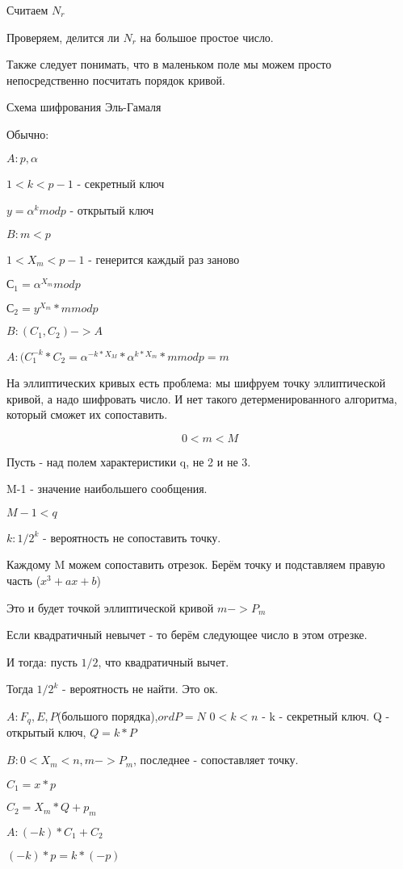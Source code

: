 Считаем $N_r$

Проверяем, делится ли $N_r$ на большое простое число. 

Также следует понимать, что в маленьком поле мы можем просто непосредственно посчитать порядок кривой. 

Схема шифрования Эль-Гамаля

Обычно:

$A: p, \alpha$

$1<k<p-1$ - секретный ключ

$y = \alpha^k mod p$ - открытый ключ

$B: m<p$

$1 < X_m < p-1$ - генерится каждый раз заново

$С_1 = \alpha^{X_m} mod p$

$С_2 = y^{X_m}*m mod p$

$B: (C_1, C_2) -> A $

$A: (C_1 ^ {-k} * C_2 = \alpha^{-k*X_M} * \alpha^{k*X_m}*m mod p = m$

На эллиптических кривых есть проблема: мы шифруем точку эллиптической кривой, а надо шифровать число. И нет такого детерменированного алгоритма, который сможет их сопоставить. 

$$ 0 < m < M $$

Пусть - над полем характеристики q, не 2 и не 3. 

M-1 - значение наибольшего сообщения. 

$ M - 1 < q$

$k : 1/{2^k}$ - вероятность не сопоставить точку. 

Каждому M можем сопоставить отрезок. Берём точку и подставляем правую часть ($x^3+ax+b$)

Это и будет точкой эллиптической кривой $m -> P_m$

Если квадратичный невычет - то берём следующее число в этом отрезке. 

И тогда: пусть $1/2$, что квадратичный вычет.

Тогда $1/2^k$ - вероятность не найти. Это ок. 

$A: F_q, E, P$(большого порядка),$ord P = N$
$0<k<n$ - k - секретный ключ. Q - открытый ключ, $Q = k*P$

$B: 0 < X_m < n, m -> P_m$,
последнее - сопоставляет точку. 

$C_1 = x*p $

$C_2 = X_m*Q + p_m$

$A: (-k)*C_1 + C_2$

$(-k)*p = k*(-p)$

